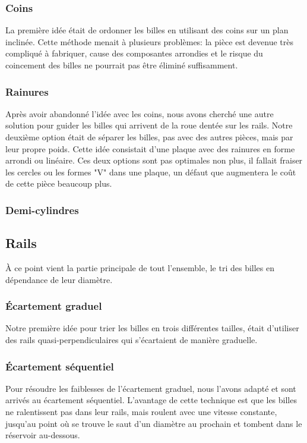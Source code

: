 \subsubsection{Coins}
La première idée était de ordonner les billes en utilisant des coins sur un plan inclinée. Cette méthode menait à plusieurs problèmes: la pièce est devenue très compliqué à fabriquer, cause des composantes arrondies et le risque du coincement des billes ne pourrait pas être éliminé suffisamment.


\subsubsection{Rainures}
Après avoir abandonné l'idée avec les coins, nous avons cherché une autre solution pour guider les billes qui arrivent de la roue dentée sur les rails. Notre deuxième option était de séparer les billes, pas avec des autres pièces, mais par leur propre poids. Cette idée consistait d'une plaque avec des rainures en forme arrondi ou linéaire. Ces deux options sont pas optimales non plus, il fallait fraiser les cercles ou les formes "V" dans une plaque, un défaut que augmentera le coût de cette pièce beaucoup plus.


\subsubsection{Demi-cylindres}


\subsection{Rails}
À ce point vient la partie principale de tout l'ensemble, le tri des billes en dépendance de leur diamètre.

\subsubsection{Écartement graduel}
Notre première idée pour trier les billes en trois différentes tailles, était d'utiliser des rails quasi-perpendiculaires qui s'écartaient de manière graduelle. 


\subsubsection{Écartement séquentiel}
Pour résoudre les faiblesses de l'écartement graduel, nous l'avons adapté et sont arrivés au écartement séquentiel. L'avantage de cette technique est que les billes ne ralentissent pas dans leur rails, mais roulent avec une vitesse constante, jusqu'au point où se trouve le saut d'un diamètre au prochain et tombent dans le réservoir au-dessous.

